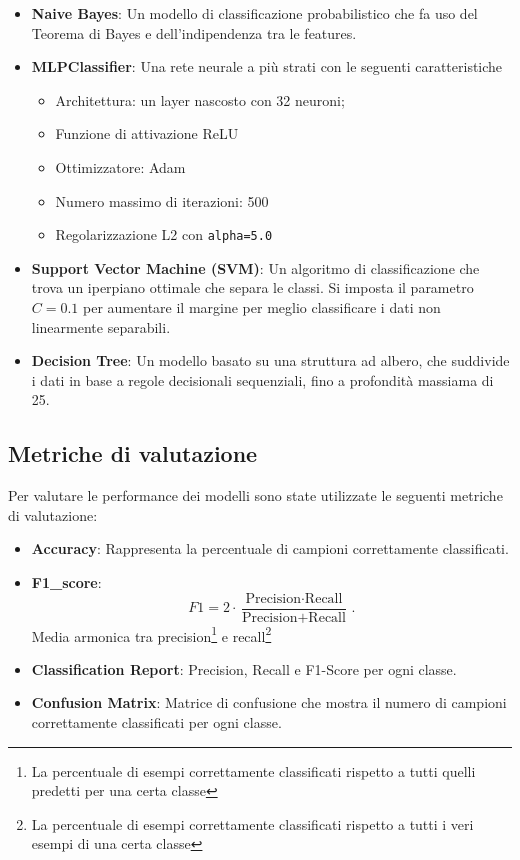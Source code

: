 \documentclass{article}
\begin{document}
\begin{itemize}
    \item \textbf{Naive Bayes}: Un modello di classificazione probabilistico che fa uso del 
    Teorema di Bayes e dell'indipendenza tra le features.  
    
    \item \textbf{MLPClassifier}: Una rete neurale a più strati con le seguenti caratteristiche
    
        \begin{itemize}
            \item Architettura: un layer nascosto con 32 neuroni;
            \item Funzione di attivazione ReLU
            \item Ottimizzatore: Adam
            \item Numero massimo di iterazioni: 500
            \item Regolarizzazione L2 con \texttt{alpha=5.0}
        \end{itemize}

    \item \textbf{Support Vector Machine (SVM)}: Un algoritmo di classificazione che trova un iperpiano 
    ottimale che separa le classi. Si imposta il parametro \( C = 0.1\) per aumentare il margine per meglio 
    classificare i dati non linearmente separabili.
    
    \item \textbf{Decision Tree}: Un modello basato su una struttura ad albero, che suddivide i dati in 
    base a regole decisionali sequenziali, fino a profondità massiama di 25. 
\end{itemize}

\subsection{Metriche di valutazione}

Per valutare le performance dei modelli sono state utilizzate le seguenti metriche di valutazione: 
\begin{itemize}
    \item \textbf{Accuracy}: Rappresenta la percentuale di campioni correttamente classificati.
    \item \textbf{F1\_score}: 
    \[
    F1 = 2 \cdot \frac{\text{Precision} \cdot \text{Recall}}{\text{Precision} + \text{Recall}} \,.
    \]
    Media armonica tra precision\footnote{La percentuale di esempi correttamente 
    classificati rispetto a tutti quelli predetti per una certa classe} e recall\footnote{La percentuale di 
    esempi correttamente classificati rispetto a tutti i veri esempi di una certa classe}
    \item \textbf{Classification Report}: Precision, Recall e F1-Score per ogni classe.
    \item \textbf{Confusion Matrix}: Matrice di confusione che mostra il numero di campioni correttamente 
    classificati per ogni classe.
\end{itemize}
\end{document}
